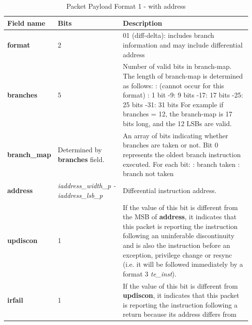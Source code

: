 \begin{table}[htp]
  \centering
  \caption{Packet Payload Format 1 - with address}
  \label{tab:te_inst0-1-addr}
  \begin{tabulary}{\textwidth}{|l|p{35mm}|p{80mm}|}
    \hline
    {\bf Field name} & {\bf Bits} & {\bf Description} \\
    \hline
    \textbf{format}	& 2	& 01 (diff-delta): includes branch information and may include differential address\\
    \hline
    \textbf{branches} & 5 & Number of valid bits in branch-map. The length of branch-map is determined as follows: :      (cannot occur for this format) : 	1 bit -9: 	9 bits -17: 	17 bits -25: 	25 bits -31: 	31 bits \newline
    For example if branches = 12, the branch-map is 17 bits long, and the 12 LSBs are valid. \\
    \hline
    \textbf{branch\_map} & Determined by \newline 
                 \textbf{branches} field. & 
                 An array of bits indicating whether branches are taken or not.\newline
    Bit 0 represents the oldest branch instruction executed.   For each bit: : branch taken : branch not taken \\
    \hline
    \textbf{address}	& \textit {iaddress\_width\_p - iaddress\_lsb\_p} & 
                Differential instruction address.\\
    \hline
    \textbf{updiscon}	& 1 & 
                If the value of this bit is different from the MSB of \textbf{address}, it indicates that this 
                packet is reporting the instruction following an uninferable discontinuity and is also the 
                instruction before an exception, privilege change or resync 
                (i.e. it will be followed immediately by a format 3 \textit{te\_inst}).\\
    \hline
    \textbf{irfail}	& 1 & 
                If the value of this bit is different from \textbf{updiscon}, it indicates that this
                packet is reporting the instruction following a return because its address differs from 

\end{tabulary}
\end{table}

